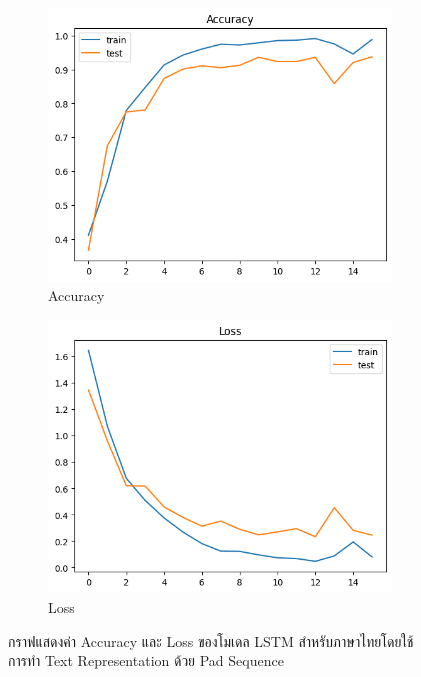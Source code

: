 \documentclass[12pt,oneside,openright,a4paper]{cpe-thai-project}
\begin{document}
      \begin{figure}[!ht]\centering
        \begin{subfigure}{0.49\textwidth}
          \includegraphics[width=\linewidth]{./img/lstm_thai_acc.png} 
          \caption{Accuracy}
          \label{fig:lstm_thai_acc}
        \end{subfigure}
        \begin{subfigure}{0.49\textwidth}
          \includegraphics[width=\linewidth]{./img/lstm_thai_loss.png}
          \caption{Loss}
          \label{fig:lstm_thai_loss}
        \end{subfigure}
        \caption{กราฟแสดงค่า Accuracy และ Loss ของโมเดล LSTM สำหรับภาษาไทยโดยใช้การทำ Text Representation ด้วย Pad Sequence}
        \label{fig:lstm_thai}
      \end{figure}
\end{document}
